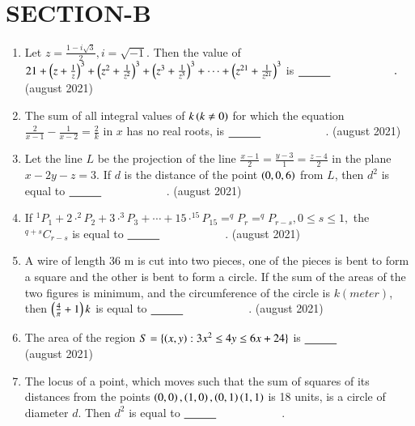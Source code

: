 \documentclass[journal,12pt,onecolumn]{IEEEtran}
\theoremstyle{remark}
\begin{document}
        \section{SECTION-B}
        \begin{enumerate}
		\item Let $z=\frac{1-i\sqrt{3}}{2},i=\sqrt{-1}$. Then the value of $21+\left(z+\frac{1}{z}\right)^{3}+\left(z^{2}+\frac{1}{z^{2}}\right)^{3}+\left(z^{3}+\frac{1}{z^{3}}\right)^{3}+\cdots+\left(z^{21}+\frac{1}{z^{21}}\right)^{3}$ is $\makebox[3cm][l]{\underline{\hspace{1cm}}}.$
      \hfill{(august 2021)}  
      \item  The sum of all integral values of $k\left(k\neq 0\right)$ for which the equation $\frac{2}{x-1}-\frac{1}{x-2}=\frac{2}{k}$ in $x$ has no real roots, is  $\makebox[3cm][l]{\underline{\hspace{1cm}}}$.
       \hfill{(august 2021)}  
       \item Let the line $L$ be the projection of the line $\frac{x-1}{2}=\frac{y-3}{1}=\frac{z-4}{2}$ in the plane $x-2y-z=3$. If $d$ is the distance of the point $\left(0, 0, 6\right)$ from $L$, then $d^{2}$ is equal to $\makebox[3cm][l]{\underline{\hspace{1cm}}}$.
        \hfill{(august 2021)}  
\item If $^{1}P_{1}+2\cdot^{2}P_{2}+3\cdot^{3}P_{3}+\cdots+15\cdot^{15}P_{15}=^{q}P_{r}=^{q}P_{r-s},0\leq s\leq1,$ the $^{q+s}C_{r-s}$ is equal to $\makebox[3cm][l]{\underline{\hspace{1cm}}}$.
\hfill{(august 2021)}  
\item A wire of length 36 m is cut into two pieces, one of the pieces is bent to form a square and the other is bent to form a circle. If the sum of the areas of the two figures is minimum, and the circumference of the circle is $k (meter)$, then $\left(\frac{4}{\pi}+1\right)k$ is equal to $\makebox[3cm][l]{\underline{\hspace{1cm}}}$.
\hfill{(august 2021)}  
\item The area of the region $S=\{\left(x,y\right):3x^2 \leq 4y \leq 6x+24\}$ is $\makebox[3cm][l]{\underline{\hspace{1cm}}}$
\hfill{(august 2021)}  
\item The locus of a point, which moves such that the sum of squares of its distances from the points $\left(0, 0\right), \left(1, 0\right), \left(0, 1\right) \left(1, 1\right)$ is 18 units, is a circle of diameter $d$. Then $d^2$ is equal to $\makebox[3cm][l]{\underline{\hspace{1cm}}}$.

\end{enumerate}
\end{document}
